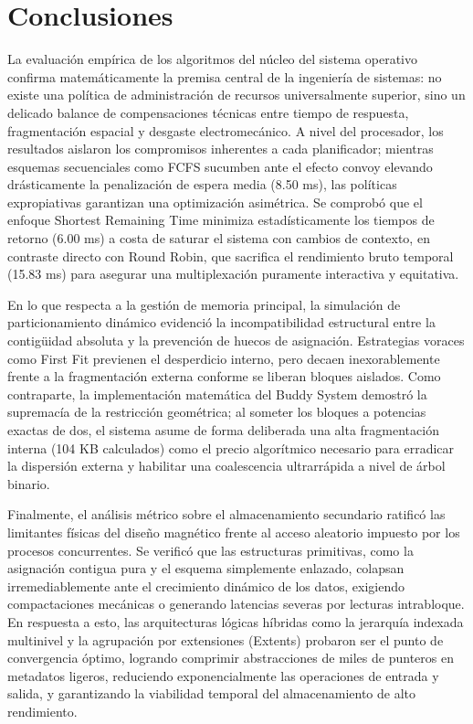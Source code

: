 \documentclass[12pt,a4paper]{article}
\begin{document}
\section{Conclusiones}

La evaluación empírica de los algoritmos del núcleo del sistema operativo confirma matemáticamente la premisa central de la ingeniería de sistemas: no existe una política de administración de recursos universalmente superior, sino un delicado balance de compensaciones técnicas entre tiempo de respuesta, fragmentación espacial y desgaste electromecánico. A nivel del procesador, los resultados aislaron los compromisos inherentes a cada planificador; mientras esquemas secuenciales como FCFS sucumben ante el efecto convoy elevando drásticamente la penalización de espera media (8.50 ms), las políticas expropiativas garantizan una optimización asimétrica. Se comprobó que el enfoque Shortest Remaining Time minimiza estadísticamente los tiempos de retorno (6.00 ms) a costa de saturar el sistema con cambios de contexto, en contraste directo con Round Robin, que sacrifica el rendimiento bruto temporal (15.83 ms) para asegurar una multiplexación puramente interactiva y equitativa.

En lo que respecta a la gestión de memoria principal, la simulación de particionamiento dinámico evidenció la incompatibilidad estructural entre la contigüidad absoluta y la prevención de huecos de asignación. Estrategias voraces como First Fit previenen el desperdicio interno, pero decaen inexorablemente frente a la fragmentación externa conforme se liberan bloques aislados. Como contraparte, la implementación matemática del Buddy System demostró la supremacía de la restricción geométrica; al someter los bloques a potencias exactas de dos, el sistema asume de forma deliberada una alta fragmentación interna (104 KB calculados) como el precio algorítmico necesario para erradicar la dispersión externa y habilitar una coalescencia ultrarrápida a nivel de árbol binario.

Finalmente, el análisis métrico sobre el almacenamiento secundario ratificó las limitantes físicas del diseño magnético frente al acceso aleatorio impuesto por los procesos concurrentes. Se verificó que las estructuras primitivas, como la asignación contigua pura y el esquema simplemente enlazado, colapsan irremediablemente ante el crecimiento dinámico de los datos, exigiendo compactaciones mecánicas o generando latencias severas por lecturas intrabloque. En respuesta a esto, las arquitecturas lógicas híbridas como la jerarquía indexada multinivel y la agrupación por extensiones (Extents) probaron ser el punto de convergencia óptimo, logrando comprimir abstracciones de miles de punteros en metadatos ligeros, reduciendo exponencialmente las operaciones de entrada y salida, y garantizando la viabilidad temporal del almacenamiento de alto rendimiento.
\end{document}
